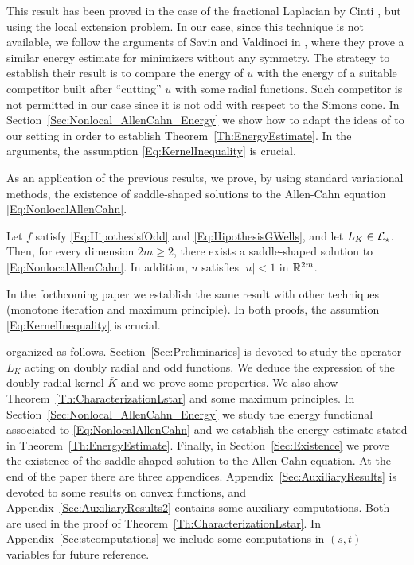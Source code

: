 This result has been proved in the case of the fractional Laplacian by Cinti \cite{Cinti-Saddle,Cinti-Saddle2}, but using the local extension problem. In our case, since this technique is not available, we follow the arguments of Savin and Valdinoci in \cite{SavinValdinoci-EnergyEstimate}, where they prove a similar energy estimate for minimizers without any symmetry. The strategy to establish their result is to compare the energy of $u$ with the energy of a suitable competitor built after ``cutting'' $u$ with some radial functions. Such competitor is not permitted in our case since it is not odd with respect to the Simons cone. In Section~\ref{Sec:Nonlocal_AllenCahn_Energy} we show how to adapt the ideas of \cite{SavinValdinoci-EnergyEstimate} to our setting in order to establish Theorem~\ref{Th:EnergyEstimate}. In the arguments, the assumption \eqref{Eq:KernelInequality} is crucial.



As an application of the previous results, we prove, by using standard variational methods, the existence of saddle-shaped solutions to the Allen-Cahn equation \eqref{Eq:NonlocalAllenCahn}.

\begin{theorem}
	\label{Th:Existence}
    Let $f$ satisfy \eqref{Eq:HipothesisfOdd} and \eqref{Eq:HipothesisGWells}, and let $L_K\in \mathcal{L}_\star$. Then, for every dimension $2m \geq 2$, there exists a saddle-shaped solution to \eqref{Eq:NonlocalAllenCahn}. In addition, $u$ satisfies $|u|<1$ in $\mathbb{R}^{2m}$.
\end{theorem}

In the forthcoming paper \cite{FelipeSanz-Perela:IntegroDifferentialII} we establish the same result with other techniques (monotone iteration and maximum principle). In both proofs, the assumtion \eqref{Eq:KernelInequality} is crucial.


 organized as follows. Section~\ref{Sec:Preliminaries} is devoted to study the operator $L_K$ acting on doubly radial and odd functions. We deduce the expression of the doubly radial kernel $\overline{K}$ and we prove some properties. We also show Theorem~\ref{Th:CharacterizationLstar} and some maximum principles. In Section~\ref{Sec:Nonlocal_AllenCahn_Energy} we study the energy functional associated to \eqref{Eq:NonlocalAllenCahn} and we establish the energy estimate stated in Theorem~\ref{Th:EnergyEstimate}. Finally, in Section~\ref{Sec:Existence} we prove the existence of the saddle-shaped solution to the Allen-Cahn equation. At the end of the paper there are three appendices. Appendix~\ref{Sec:AuxiliaryResults} is devoted to some results on convex functions, and Appendix~\ref{Sec:AuxiliaryResults2} contains some auxiliary computations. Both are used in the proof of Theorem~\ref{Th:CharacterizationLstar}. In Appendix~\ref{Sec:stcomputations} we include some computations in $(s,t)$ variables for future reference.